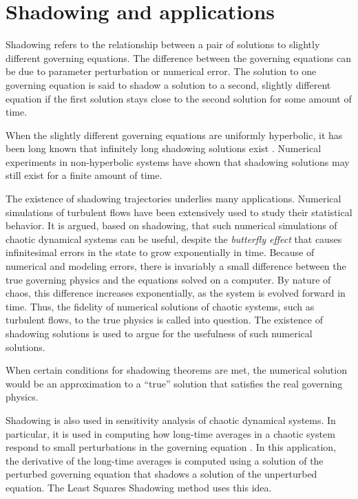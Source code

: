 \documentclass[preprint,12pt]{elsarticle}
\begin{document}
\section{Shadowing and applications}
\label{sec:shadowingIntro}
Shadowing refers to the relationship between a pair of solutions to slightly different governing equations. The difference between the governing equations can be due to parameter perturbation or numerical error. The solution to one governing equation is said to shadow a solution to a second, slightly different equation if
the first solution stays close to the second solution for some amount of time.

When the slightly different governing equations are uniformly hyperbolic, it has been long known that infinitely 
long shadowing solutions exist \cite{anosov}\cite{bowen}.
Numerical experiments in non-hyperbolic systems have shown that shadowing
solutions may still exist \cite{grebogi}\cite{hammel} for a 
finite amount of time.

The existence of shadowing trajectories underlies many applications.
Numerical simulations of turbulent flows have been extensively used to study their statistical behavior. It is argued, based on shadowing, that such numerical simulations of chaotic dynamical systems can be
useful, despite the \emph{butterfly effect} that causes infinitesimal errors in the state to grow exponentially in time. Because of numerical and modeling errors, there is invariably a small difference between the true governing physics and the equations solved on a computer. By nature of chaos, this difference increases exponentially, as the system is evolved forward in time. Thus, the fidelity of numerical solutions of chaotic systems, such
as turbulent flows, to the true physics is called into question.  The existence of shadowing solutions
is used to argue for the usefulness of such numerical solutions.

When certain conditions for shadowing theorems are met, the numerical solution would be an
approximation to a ``true'' solution that satisfies the real governing physics.

Shadowing is also used in sensitivity analysis of chaotic dynamical systems.  In particular,
it is used in computing how long-time averages in a chaotic system
respond to small perturbations in the governing equation \cite{qiqi-lss}\cite{angxiu-lss}\cite{lasagna}. In this application, the derivative
of the long-time averages is computed using a solution of the perturbed governing equation
that shadows a solution of the unperturbed equation.  The Least Squares Shadowing \cite{qiqi-lss}\cite{angxiu-lss} method
uses this idea.
\end{document}
